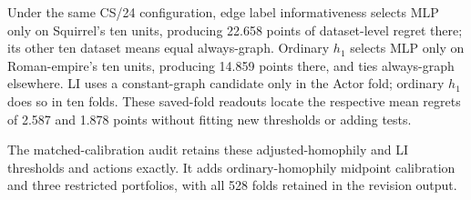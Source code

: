 Under the same CS/24 configuration, edge label informativeness selects MLP only on Squirrel's ten units, producing 22.658 points of dataset-level regret there; its other ten dataset means equal always-graph. Ordinary $h_1$ selects MLP only on Roman-empire's ten units, producing 14.859 points there, and ties always-graph elsewhere. LI uses a constant-graph candidate only in the Actor fold; ordinary $h_1$ does so in ten folds. These saved-fold readouts locate the respective mean regrets of 2.587 and 1.878 points without fitting new thresholds or adding tests.

The matched-calibration audit retains these adjusted-homophily and LI thresholds and actions exactly. It adds ordinary-homophily midpoint calibration and three restricted portfolios, with all 528 folds retained in the revision output.
